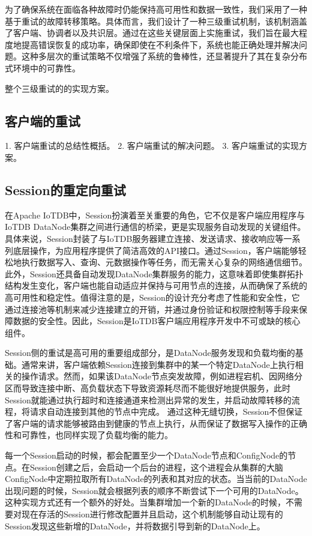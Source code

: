 为了确保系统在面临各种故障时仍能保持高可用性和数据一致性，我们采用了一种基于重试的故障转移策略。具体而言，我们设计了一种三级重试机制，该机制涵盖了客户端、协调者以及共识层。通过在这些关键层面上实施重试，我们旨在最大程度地提高错误恢复的成功率，确保即使在不利条件下，系统也能正确处理并解决问题。这种多层次的重试策略不仅增强了系统的鲁棒性，还显著提升了其在复杂分布式环境中的可靠性。

整个三级重试的的实现方案。

\subsection{客户端的重试}

1. 客户端重试的总结性概括。
2. 客户端重试的解决问题。
3. 客户端重试的实现方案。

\subsection{Session的重定向重试}

在Apache IoTDB中，Session扮演着至关重要的角色，它不仅是客户端应用程序与IoTDB DataNode集群之间进行通信的桥梁，更是实现服务自动发现的关键组件。具体来说，Session封装了与IoTDB服务器建立连接、发送请求、接收响应等一系列底层操作，为应用程序提供了简洁高效的API接口。通过Session，客户端能够轻松地执行数据写入、查询、元数据操作等任务，而无需关心复杂的网络通信细节。此外，Session还具备自动发现DataNode集群服务的能力，这意味着即使集群拓扑结构发生变化，客户端也能自动适应并保持与可用节点的连接，从而确保了系统的高可用性和稳定性。值得注意的是，Session的设计充分考虑了性能和安全性，它通过连接池等机制来减少连接建立的开销，并通过身份验证和权限控制等手段来保障数据的安全性。因此，Session是IoTDB客户端应用程序开发中不可或缺的核心组件。

Session侧的重试是高可用的重要组成部分，是DataNode服务发现和负载均衡的基础。通常来讲，客户端依赖Session连接到集群中的某一个特定DataNode上执行相关的操作请求。然而，如果该DataNode节点突发故障，例如进程宕机、因网络分区而导致连接中断、高负载状态下导致资源耗尽而不能很好地提供服务，此时Session就能通过执行超时和连接通道来检测出异常的发生，并启动故障转移的流程，将请求自动连接到其他的节点中完成。
通过这种无缝切换，Session不但保证了客户端的请求能够被路由到健康的节点上执行，从而保证了数据写入操作的正确性和可靠性，也同样实现了负载均衡的能力。

每一个Session启动的时候，都会配置至少一个DataNode节点和ConfigNode的节点。在Session创建之后，会启动一个后台的进程，这个进程会从集群的大脑ConfigNode中定期拉取所有DataNode的列表和其对应的状态。当当前的DataNode出现问题的时候，Session就会根据列表的顺序不断尝试下一个可用的DataNode。这种实现方式还有一个额外的好处。当集群增加一个新的DataNode的时候，不需要对现在存活的Session进行修改配置并且启动，这个机制能够自动让现有的Session发现这些新增的DataNode，并将数据引导到新的DataNode上。

